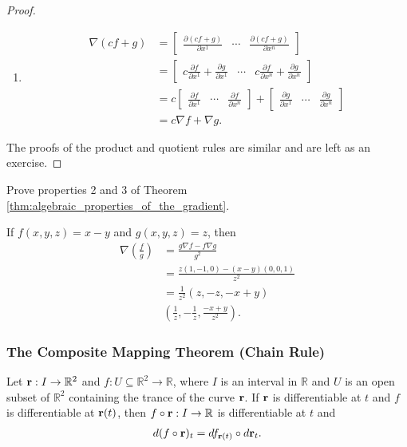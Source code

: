 \documentclass[12pt,letterpaper,reqno]{article}
\numberwithin{equation}{section}
\newcommand{\R}{\ensuremath{\mathbb R}}
\newcommand{\bbr}{{\bf r}}
\begin{document}
{\begin{proof}
\begin{enumerate}
	\item 
	\begin{align*}
		\nabla(cf+g)&= \begin{bmatrix}
			\frac{\partial (cf+g)}{\partial x^1} & \cdots & \frac{\partial (cf+g)}{\partial x^n}
		\end{bmatrix} \\
		&=\begin{bmatrix}
			c\frac{\partial f}{\partial x^1}+ \frac{\partial g}{\partial x^1}& \cdots & c\frac{\partial f}{\partial x^n}+\frac{\partial g}{\partial x^n}
		\end{bmatrix} \\
		&=c\begin{bmatrix}
			\frac{\partial f}{\partial x^1}& \cdots & \frac{\partial f}{\partial x^n}
		\end{bmatrix}+\begin{bmatrix}
			\frac{\partial g}{\partial x^1}& \cdots & \frac{\partial g}{\partial x^n}
		\end{bmatrix} \\
		&=c\nabla f+\nabla g.
			\end{align*}
\end{enumerate}
The proofs of the product and quotient rules are similar and are left as an exercise.
\end{proof}

\begin{exercise}
Prove properties 2 and 3 of Theorem \ref{thm:algebraic_properties_of_the_gradient}.	
\end{exercise}

\begin{example}
If $f(x,y,z)=x-y$ and $g(x,y,z)=z$, then
\begin{align*}
	\nabla\left(\frac{f}{g}\right)&=\frac{g \nabla f-f \nabla g}{g^2} \\
	&=\frac{z(1,-1,0)-(x-y)(0,0,1)}{z^2} \\
	&=\frac{1}{z^2}(z,-z,-x+y) \\
	&(\frac{1}{z},-\frac{1}{z},\frac{-x+y}{z^2}).
\end{align*}	
\end{example}

\subsubsection{The Composite Mapping Theorem (Chain Rule)}
\begin{thm}
	Let $\bbr:I \to \R^2$ and $f:U \subseteq \R^2 \to \R$, where $I$ is an interval in $\R$ and $U$ is an open subset of $\R^2$ containing the trance of the curve $\bbr$. If $\bbr$ is differentiable at $t$ and $f$ is differentiable at $\bbr(t)$, then $f \circ \bbr:I \to \R$ is differentiable at $t$ and
	\begin{align*}
		d(f \circ \bbr)_{t}=df_{\bbr(t)} \circ d\bbr_t.
	\end{align*}
\end{thm}

}
\end{document}
